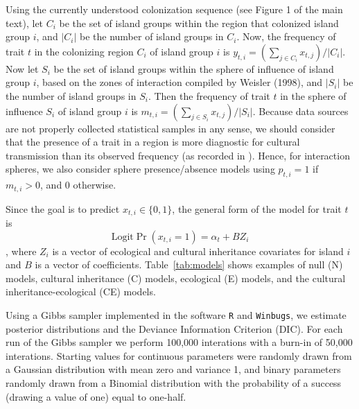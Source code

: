 \documentclass[11pt]{article}
\begin{document}
Using the currently understood colonization sequence (see Figure 1 of the main text), let $C_i$ be the set of island groups within the region that colonized island group $i$, and $|C_i|$ be the number of island groups in $C_i$. Now, the frequency of trait $t$ in the colonizing region $C_i$ of island group $i$ is $y_{t,i} = \left( \sum_{j \in C_i} x_{t,j} \right) / |C_i|$. Now let $S_i$ be the set of island groups within the sphere of influence of island group $i$, based on the zones of interaction compiled by Weisler (1998), and $|S_i|$ be the number of island groups in $S_i$. Then the frequency of trait $t$ in the sphere of influence $S_i$ of island group $i$ is $m_{t,i}= \left(\sum_{j \in S_i} x_{t,j} \right) / |S_i|$. Because data sources are not properly collected statistical samples in any sense, we should consider that the presence of a trait in a region is more diagnostic for cultural transmission than its observed frequency (as recorded in \cite{HaddonHornell1936}). Hence, for interaction spheres, we also consider sphere presence/absence models using $p_{t,i}= 1$ if $m_{t,i}>0$, and $0$ otherwise.

Since the goal is to predict $x_{t,i} \in \{0,1\}$, the general form of the model for trait $t$ is
    \[\mathrm{Logit} \Pr( x_{t,i}=1 ) = \alpha_t + B Z_i \],
where $Z_i$ is a vector of ecological and cultural inheritance covariates for island $i$ and $B$ is a vector of coefficients. Table~\ref{tab:models} shows examples of null (N) models, cultural inheritance (C) models, ecological (E)  models, and the cultural inheritance-ecological (CE) models.

Using a Gibbs sampler implemented in the software \texttt{R} and \texttt{Winbugs}, we estimate posterior distributions and the Deviance Information Criterion (DIC). For each run of the Gibbs sampler we perform 100,000 interations with a burn-in of 50,000 interations. Starting values for continuous parameters were randomly drawn from a Gaussian distribution with mean zero and variance 1, and binary parameters randomly drawn from a Binomial distribution with the probability of a success (drawing a value of one) equal to one-half.
\end{document}
